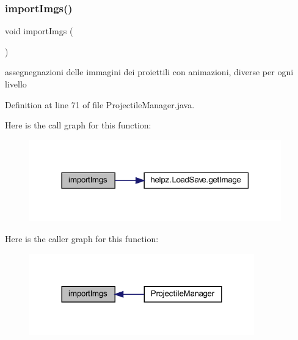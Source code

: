 \subsubsection{\texorpdfstring{import\+Imgs()}{importImgs()}}
{\footnotesize\ttfamily void import\+Imgs (\begin{DoxyParamCaption}{ }\end{DoxyParamCaption})\hspace{0.3cm}{\ttfamily [private]}}



assegnegnazioni delle immagini dei proiettili con animazioni, diverse per ogni livello 



Definition at line 71 of file Projectile\+Manager.\+java.

Here is the call graph for this function\+:\nopagebreak
\begin{figure}[H]
\begin{center}
\leavevmode
\includegraphics[width=309pt]{classmanagers_1_1_projectile_manager_a78da03d9c5782fb25189cee3d4c78bfd_cgraph}
\end{center}
\end{figure}
Here is the caller graph for this function\+:\nopagebreak
\begin{figure}[H]
\begin{center}
\leavevmode
\includegraphics[width=276pt]{classmanagers_1_1_projectile_manager_a78da03d9c5782fb25189cee3d4c78bfd_icgraph}
\end{center}
\end{figure}
\mbox{\label{classmanagers_1_1_projectile_manager_a57d53b4aface986fa08a24dab39b621d}} 
